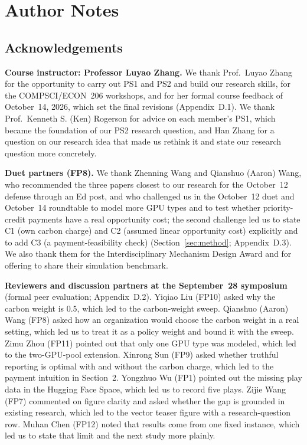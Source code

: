 \clearpage\nobalance\sloppy
\section*{Author Notes}
\subsection*{Acknowledgements}
\textbf{Course instructor: Professor Luyao Zhang.} We thank Prof.~Luyao Zhang for the opportunity to carry out PS1 and PS2 and build our research skills, for the COMPSCI/ECON~206 workshops, and for her formal course feedback of October~14, 2026, which set the final revisions (Appendix~D.1). We thank Prof.~Kenneth S. (Ken) Rogerson for advice on each member's PS1, which became the foundation of our PS2 research question, and Han Zhang for a question on our research idea that made us rethink it and state our research question more concretely.

\textbf{Duet partners (FP8).} We thank Zhenning Wang and Qianshuo (Aaron) Wang, who recommended the three papers closest to our research for the October~12 defense through an Ed post, and who challenged us in the October~12 duet and October~14 roundtable to model more GPU types and to test whether priority-credit payments have a real opportunity cost; the second challenge led us to state C1 (own carbon charge) and C2 (assumed linear opportunity cost) explicitly and to add C3 (a payment-feasibility check) (Section~\ref{sec:method}; Appendix~D.3). We also thank them for the Interdisciplinary Mechanism Design Award and for offering to share their simulation benchmark.

\textbf{Reviewers and discussion partners at the September~28 symposium} (formal peer evaluation; Appendix~D.2). Yiqiao Liu (FP10) asked why the carbon weight is 0.5, which led to the carbon-weight sweep. Qianshuo (Aaron) Wang (FP8) asked how an organization would choose the carbon weight in a real setting, which led us to treat it as a policy weight and bound it with the sweep. Zimu Zhou (FP11) pointed out that only one GPU type was modeled, which led to the two-GPU-pool extension. Xinrong Sun (FP9) asked whether truthful reporting is optimal with and without the carbon charge, which led to the payment intuition in Section~2. Yongzhuo Wu (FP1) pointed out the missing play data in the Hugging Face Space, which led us to record five plays. Zijie Wang (FP7) commented on figure clarity and asked whether the gap is grounded in existing research, which led to the vector teaser figure with a research-question row. Muhan Chen (FP12) noted that results come from one fixed instance, which led us to state that limit and the next study more plainly.

